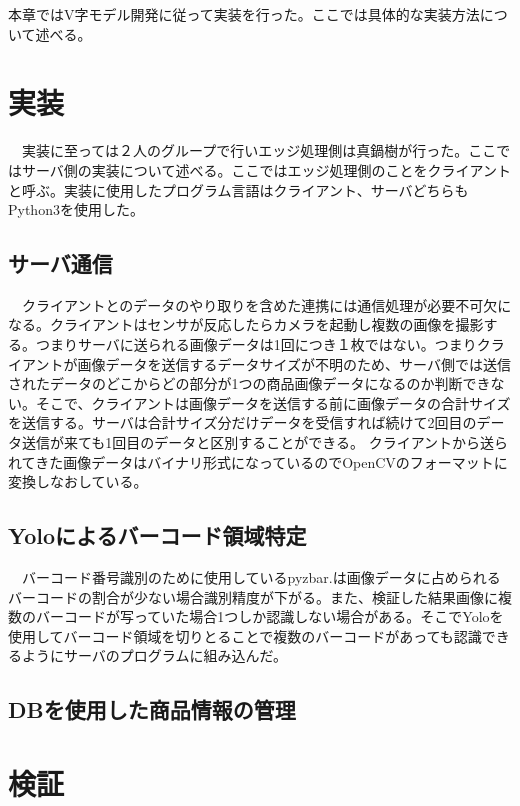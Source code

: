 本章ではV字モデル開発に従って実装を行った。ここでは具体的な実装方法について述べる。
\section{実装}
　実装に至っては２人のグループで行いエッジ処理側は真鍋樹が行った。ここではサーバ側の実装について述べる。ここではエッジ処理側のことをクライアントと呼ぶ。実装に使用したプログラム言語はクライアント、サーバどちらもPython3を使用した。

\subsection*{サーバ通信}
　クライアントとのデータのやり取りを含めた連携には通信処理が必要不可欠になる。クライアントはセンサが反応したらカメラを起動し複数の画像を撮影する。つまりサーバに送られる画像データは1回につき１枚ではない。つまりクライアントが画像データを送信するデータサイズが不明のため、サーバ側では送信されたデータのどこからどの部分が1つの商品画像データになるのか判断できない。そこで、クライアントは画像データを送信する前に画像データの合計サイズを送信する。サーバは合計サイズ分だけデータを受信すれば続けて2回目のデータ送信が来ても1回目のデータと区別することができる。
クライアントから送られてきた画像データはバイナリ形式になっているのでOpenCVのフォーマットに変換しなおしている。

\subsection*{Yoloによるバーコード領域特定}
　バーコード番号識別のために使用しているpyzbar\cite{pyzbar}.は画像データに占められるバーコードの割合が少ない場合識別精度が下がる。また、検証した結果画像に複数のバーコードが写っていた場合1つしか認識しない場合がある。そこでYoloを使用してバーコード領域を切りとることで複数のバーコードがあっても認識できるようにサーバのプログラムに組み込んだ。

\subsection*{DBを使用した商品情報の管理}

\section{検証}